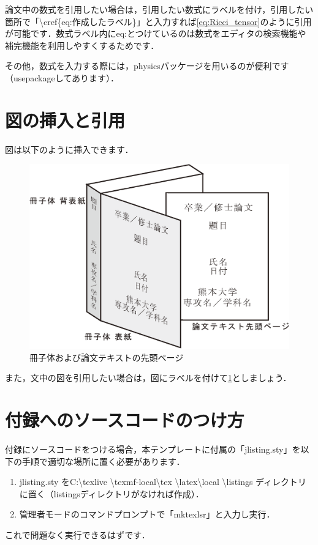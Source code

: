 	論文中の数式を引用したい場合は，引用したい数式にラベルを付け，引用したい箇所で「\textbackslash cref\{eq:作成したラベル\}」と入力すれば\cref{eq:Ricci_tensor}のように引用が可能です．数式ラベル内にeq:とつけているのは数式をエディタの検索機能や補完機能を利用しやすくするためです．

	その他，数式を入力する際には，physicsパッケージを用いるのが便利です（usepackageしてあります）．

	\section{図の挿入と引用}
	図は以下のように挿入できます．
		\begin{figure}[htbp]
			\centering
			\includegraphics[width=1.0\linewidth,keepaspectratio]{./images/book.eps}
			\caption{冊子体および論文テキストの先頭ページ}
			\label{fig:overview}
		\end{figure}

	また，文中の図を引用したい場合は，図にラベルを付けて\cref{fig:overview}としましょう．

	\section{付録へのソースコードのつけ方}
	付録にソースコードをつける場合，本テンプレートに付属の「jlisting.sty」を以下の手順で適切な場所に置く必要があります．

		\begin{enumerate}
			\item jlisting.sty をC:\textbackslash texlive \textbackslash texmf-local\textbackslash tex \textbackslash latex\textbackslash local \textbackslash listings ディレクトリに置く（listingsディレクトリがなければ作成）．
			\item 管理者モードのコマンドプロンプトで「mktexlsr」と入力し実行．
		\end{enumerate}

	これで問題なく実行できるはずです．
